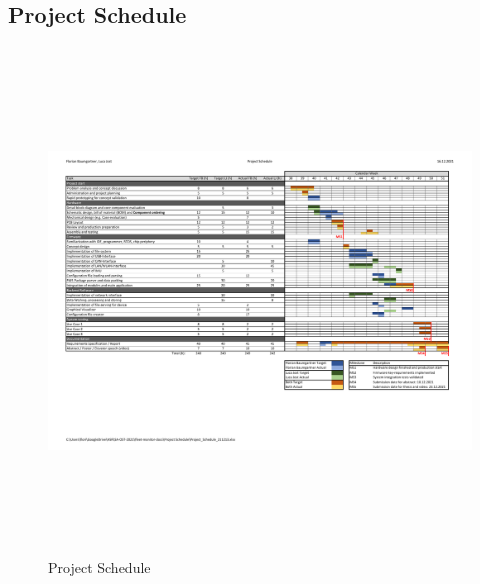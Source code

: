 \begin{landscape}
    \section{Project Schedule}
    \begin{figure}[h!]
    	\includegraphics[height=13.4cm, trim=17mm 64mm 24mm 19mm, clip]{appendix/Project_Schedule_211213}
    	\bigskip
    	\caption{Project Schedule}
    	\hfuzz=19.0pt
	    \vspace{-1.5cm}
	    \label{fig:project_schedule}
    \end{figure}
\end{landscape}
\newpage
\addtolength{\textheight}{\topskip}